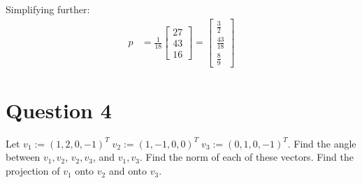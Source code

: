 \documentclass{article}
\begin{document}
Simplifying further:
\begin{align*}
    p &= \frac{1}{18} \begin{bmatrix} 27 \\ 43 \\ 16 \end{bmatrix}
    =\begin{bmatrix}
        \frac{3}{2} \\
        \frac{43}{18} \\
        \frac{8}{9}
    \end{bmatrix}
\end{align*}

\newpage
\section*{Question 4}
Let $v_1 := (1, 2, 0, -1)^T \; v_2 := (1, -1, 0, 0)^T \; v_3 := (0, 1, 0, -1)^T$.
Find the angle between $v_1, v_2$, $v_2, v_3$, and $v_1, v_3$.
Find the norm of each of these vectors.
Find the projection of $v_1$ onto $v_2$ and onto $v_3$.
\end{document}
